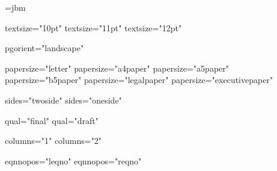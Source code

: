 \msi@inline@proc={jbm}







\def\msi@stylesheets{\msitag{<?xml-stylesheet href="css/my.css" type="text/css"?>}\br}


\def\@brace#1{\char123\relax#1\char125\relax}

\def\br{\msitag{^^0a}}


\newif\ifmsi@firstopt
\msi@firstopttrue


\expandafter\def\csname 10ptAttrib\endcsname{textsize="10pt"}
\expandafter\def\csname 11ptAttrib\endcsname{textsize="11pt"}
\expandafter\def\csname 12ptAttrib\endcsname{textsize="12pt"}

\expandafter\def\csname landscapeAttrib\endcsname{pgorient="landscape"}

\expandafter\def\csname letterpaperAttrib\endcsname{papersize="letter"}
\expandafter\def\csname a4paperAttrib\endcsname{papersize="a4paper"}
\expandafter\def\csname a5paperAttrib\endcsname{papersize="a5paper"}
\expandafter\def\csname b5paperAttrib\endcsname{papersize="b5paper"}
\expandafter\def\csname legalpaperAttrib\endcsname{papersize="legalpaper"}
\expandafter\def\csname executivepaperAttrib\endcsname{papersize="executivepaper"}

\expandafter\def\csname twosideAttrib\endcsname{sides="twoside"}
\expandafter\def\csname onesideAttrib\endcsname{sides="oneside"}

\expandafter\def\csname finalAttrib\endcsname{qual="final"}
\expandafter\def\csname draftAttrib\endcsname{qual="draft"}

\expandafter\def\csname onecolumnAttrib\endcsname{columns="1"}
\expandafter\def\csname twocolumnAttrib\endcsname{columns="2"}

\expandafter\def\csname leqnoAttrib\endcsname{eqnnopos="leqno"}
\expandafter\def\csname reqnoAttrib\endcsname{eqnnopos="reqno"}

